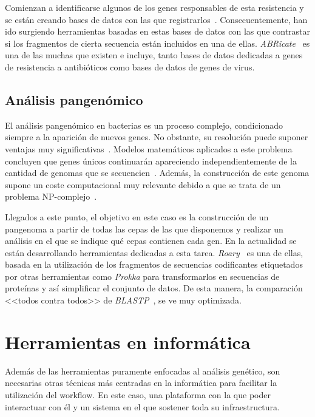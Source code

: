 Comienzan a identificarse algunos de los genes responsables de esta resistencia y se están creando bases de datos con las que registrarlos~\cite{ARDB}. Consecuentemente, han ido surgiendo herramientas basadas en estas bases de datos con las que contrastar si los fragmentos de cierta secuencia están incluidos en una de ellas. \textit{ABRicate}~\cite{seemann_:mag_right:_2019} es una de las muchas que existen e incluye, tanto bases de datos dedicadas a genes de resistencia a antibióticos como bases de datos de genes de virus.

\subsection{Análisis pangenómico}
El análisis pangenómico en bacterias es un proceso complejo, condicionado siempre a la aparición de nuevos genes. No obstante, su resolución puede suponer ventajas muy significativas~\cite{MEDINI2005589}. Modelos matemáticos aplicados a este problema concluyen que genes únicos continuarán apareciendo independientemente de la cantidad de genomas que se secuencien~\cite{Tettelin13950}. Además, la construcción de este genoma supone un coste computacional muy relevante debido a que se trata de un problema NP-complejo~\cite{Nguyen2015}.

Llegados a este punto, el objetivo en este caso es la construcción de un pangenoma a partir de todas las cepas de las que disponemos y realizar un análisis en el que se indique qué cepas contienen cada gen. En la actualidad se están desarrollando herramientas dedicadas a esta tarea. \textit{Roary}~\cite{Page2015} es una de ellas, basada en la utilización de los fragmentos de secuencias codificantes etiquetados por otras herramientas como \textit{Prokka} para transformarlos en secuencias de proteínas y así simplificar el conjunto de datos. De esta manera, la comparación <<todos contra todos>> de \textit{BLASTP}~\cite{Madden}, se ve muy optimizada.

\section{Herramientas en informática}
Además de las herramientas puramente enfocadas al análisis genético, son necesarias otras técnicas más centradas en la informática para facilitar la utilización del workflow. En este caso, una plataforma con la que poder interactuar con él y un sistema en el que sostener toda su infraestructura.
